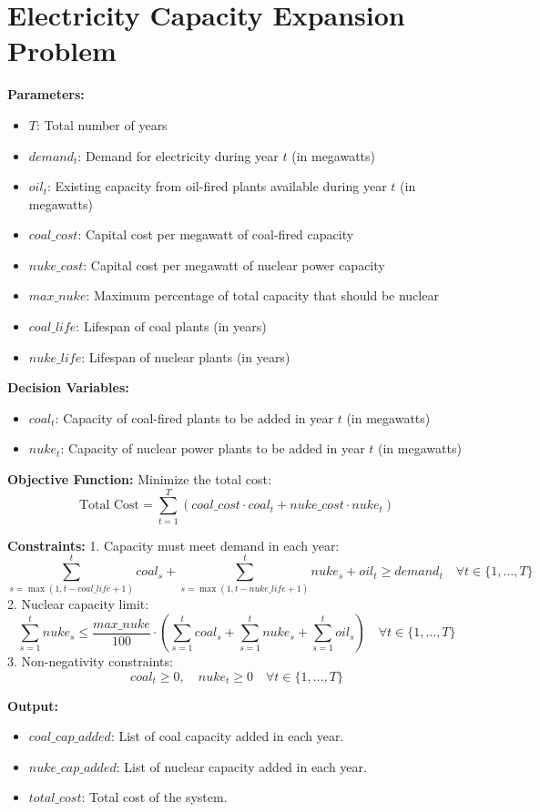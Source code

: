 \documentclass{article}
\begin{document}
\section*{Electricity Capacity Expansion Problem}

\textbf{Parameters:}
\begin{itemize}
    \item $T$: Total number of years
    \item $demand_t$: Demand for electricity during year $t$ (in megawatts)
    \item $oil_t$: Existing capacity from oil-fired plants available during year $t$ (in megawatts)
    \item $coal\_cost$: Capital cost per megawatt of coal-fired capacity
    \item $nuke\_cost$: Capital cost per megawatt of nuclear power capacity
    \item $max\_nuke$: Maximum percentage of total capacity that should be nuclear
    \item $coal\_life$: Lifespan of coal plants (in years)
    \item $nuke\_life$: Lifespan of nuclear plants (in years)
\end{itemize}

\textbf{Decision Variables:}
\begin{itemize}
    \item $coal_t$: Capacity of coal-fired plants to be added in year $t$ (in megawatts)
    \item $nuke_t$: Capacity of nuclear power plants to be added in year $t$ (in megawatts)
\end{itemize}

\textbf{Objective Function:}
Minimize the total cost:
\[
\text{Total Cost} = \sum_{t=1}^{T} (coal\_cost \cdot coal_t + nuke\_cost \cdot nuke_t)
\]

\textbf{Constraints:}
1. Capacity must meet demand in each year:
\[
\sum_{s=\max(1,t-coal\_life+1)}^{t} coal_s + \sum_{s=\max(1,t-nuke\_life+1)}^{t} nuke_s + oil_t \geq demand_t \quad \forall t \in \{1, \ldots, T\}
\]
2. Nuclear capacity limit:
\[
\sum_{s=1}^{t} nuke_s \leq \frac{max\_nuke}{100} \cdot \left(\sum_{s=1}^{t} coal_s + \sum_{s=1}^{t} nuke_s + \sum_{s=1}^{t} oil_s\right) \quad \forall t \in \{1, \ldots, T\}
\]
3. Non-negativity constraints:
\[
coal_t \geq 0, \quad nuke_t \geq 0 \quad \forall t \in \{1, \ldots, T\}
\]

\textbf{Output:}
\begin{itemize}
    \item $coal\_cap\_added$: List of coal capacity added in each year.
    \item $nuke\_cap\_added$: List of nuclear capacity added in each year.
    \item $total\_cost$: Total cost of the system.
\end{itemize}
\end{document}
